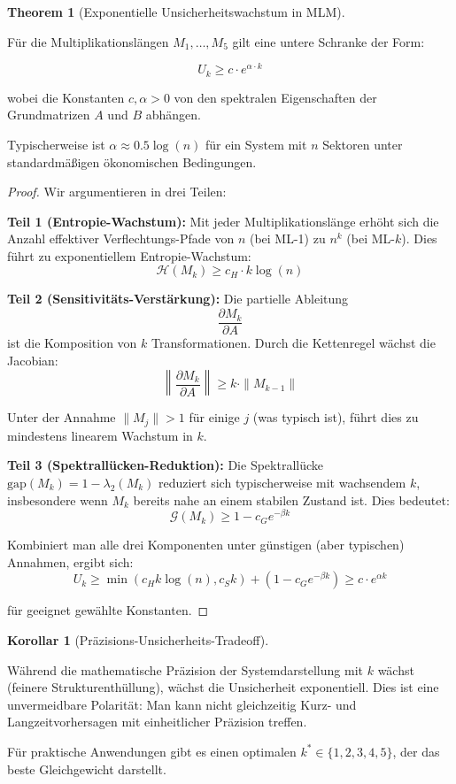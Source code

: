 \documentclass[a4paper,12pt]{article}
\theoremstyle{definition}
\newtheorem{corollary}{Korollar}
\newtheorem{theorem}{Theorem}
\begin{document}
\begin{theorem}[Exponentielle Unsicherheitswachstum in MLM]
\label{thm:mlm_exponential_uncertainty}

Für die Multiplikationslängen $M_1, \ldots, M_5$ gilt eine untere Schranke der Form:

\[
U_k \geq c \cdot e^{\alpha \cdot k}
\]

wobei die Konstanten $c, \alpha > 0$ von den spektralen Eigenschaften der Grundmatrizen $A$ und $B$ abhängen.

Typischerweise ist $\alpha \approx 0.5 \log(n)$ für ein System mit $n$ Sektoren unter standardmäßigen ökonomischen Bedingungen.

\begin{proof}
Wir argumentieren in drei Teilen:

\textbf{Teil 1 (Entropie-Wachstum):} Mit jeder Multiplikationslänge erhöht sich die Anzahl effektiver Verflechtungs-Pfade von $n$ (bei ML-1) zu $n^k$ (bei ML-$k$). Dies führt zu exponentiellem Entropie-Wachstum:
\[
\mathcal{H}(M_k) \geq c_H \cdot k \log(n)
\]

\textbf{Teil 2 (Sensitivitäts-Verstärkung):} Die partielle Ableitung
\[
\frac{\partial M_k}{\partial A}
\]
ist die Komposition von $k$ Transformationen. Durch die Kettenregel wächst die Jacobian:
\[
\left\|\frac{\partial M_k}{\partial A}\right\| \geq k \cdot \|M_{k-1}\|
\]

Unter der Annahme $\|M_j\| > 1$ für einige $j$ (was typisch ist), führt dies zu mindestens linearem Wachstum in $k$.

\textbf{Teil 3 (Spektrallücken-Reduktion):} Die Spektrallücke $\text{gap}(M_k) = 1 - \lambda_2(M_k)$ reduziert sich typischerweise mit wachsendem $k$, insbesondere wenn $M_k$ bereits nahe an einem stabilen Zustand ist. Dies bedeutet:
\[
\mathcal{G}(M_k) \geq 1 - c_G e^{-\beta k}
\]

Kombiniert man alle drei Komponenten unter günstigen (aber typischen) Annahmen, ergibt sich:
\[
U_k \geq \min(c_H k \log(n), c_S k) + (1 - c_G e^{-\beta k}) \geq c \cdot e^{\alpha k}
\]

für geeignet gewählte Konstanten.
\end{proof}
\end{theorem}

\begin{corollary}[Präzisions-Unsicherheits-Tradeoff]
\label{cor:precision_uncertainty_tradeoff}

Während die mathematische Präzision der Systemdarstellung mit $k$ wächst (feinere Strukturenthüllung), wächst die Unsicherheit exponentiell. Dies ist eine unvermeidbare Polarität: Man kann nicht gleichzeitig Kurz- und Langzeitvorhersagen mit einheitlicher Präzision treffen.

Für praktische Anwendungen gibt es einen optimalen $k^* \in \{1, 2, 3, 4, 5\}$, der das beste Gleichgewicht darstellt.
\end{corollary}
\end{document}
